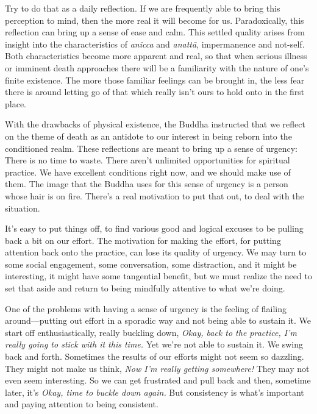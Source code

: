 Try to do that as a daily reflection. If we are frequently able to 
bring this perception to mind, then the more real it will become for 
us. Paradoxically, this reflection can bring up a sense of ease and 
calm. This settled quality arises from insight into the characteristics 
of \emph{anicca} and \emph{anattā}, impermanence and not-self. Both 
characteristics become more apparent and real, so that when serious 
illness or imminent death approaches there will be a familiarity with 
the nature of one's finite existence. The more those familiar feelings 
can be brought in, the less fear there is around letting go of that 
which really isn't ours to hold onto in the first place.


With the drawbacks of physical existence, the Buddha instructed that we 
reflect on the theme of death as an antidote to our interest in being 
reborn into the conditioned realm. These reflections are meant to bring 
up a sense of urgency: There is no time to waste. There aren't 
unlimited opportunities for spiritual practice. We have excellent 
conditions right now, and we should make use of them. The image that 
the Buddha uses for this sense of urgency is a person whose hair is on 
fire. There's a real motivation to put that out, to deal with the 
situation.

It's easy to put things off, to find various good and logical excuses 
to be pulling back a bit on our effort. The motivation for making the 
effort, for putting attention back onto the practice, can lose its 
quality of urgency. We may turn to some social engagement, some 
conversation, some distraction, and it might be interesting, it might 
have some tangential benefit, but we must realize the need to set that 
aside and return to being mindfully attentive to what we're doing.

One of the problems with having a sense of urgency is the feeling of 
flailing around---putting out effort in a sporadic way and not being 
able to sustain it. We start off enthusiastically, really buckling 
down, \emph{Okay, back to the practice, I'm really going to stick with 
it this time.} Yet we're not able to sustain it. We swing back and 
forth. Sometimes the results of our efforts might not seem so dazzling. 
They might not make us think, \emph{Now I'm really getting somewhere!} 
They may not even seem interesting. So we can get frustrated and pull 
back and then, sometime later, it's \emph{Okay, time to buckle down 
again.} But consistency is what's important and paying attention to 
being consistent.

